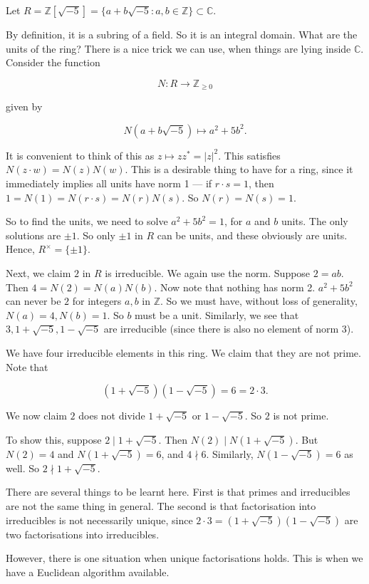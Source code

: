 \documentclass[12pt, a4paper]{article}
\begin{document}
\begin{mdexample}[Counterexample]
Let \( R = \mathbb{Z}[\sqrt{-5}] = \{a + b\sqrt{-5} : a, b \in \mathbb{Z}\} \subset \mathbb{C} \). 

By definition, it is a subring of a field. So it is an integral domain. What are the units of the ring? There is a nice trick we can use, when things are lying inside \(\mathbb{C}\). Consider the function

\[ N : R \to \mathbb{Z}_{\geq 0} \]

given by

\[ N(a + b\sqrt{-5}) \mapsto a^2 + 5b^2. \]

It is convenient to think of this as \( z \mapsto zz^* = |z|^2 \). This satisfies \( N(z \cdot w) = N(z)N(w) \). This is a desirable thing to have for a ring, since it immediately implies all units have norm 1 — if \( r \cdot s = 1 \), then \( 1 = N(1) = N(r \cdot s) = N(r)N(s) \). So \( N(r) = N(s) = 1 \).

So to find the units, we need to solve \( a^2 + 5b^2 = 1 \), for \( a \) and \( b \) units. The only solutions are \( \pm 1 \). So only \( \pm 1 \) in \( R \) can be units, and these obviously are units. Hence, \( R^\times = \{ \pm 1\} \).

Next, we claim \( 2 \) in \( R \) is irreducible. We again use the norm. Suppose \( 2 = ab \). Then \( 4 = N(2) = N(a)N(b) \). Now note that nothing has norm 2. \( a^2 + 5b^2 \) can never be \( 2 \) for integers \( a, b \) in \( \mathbb{Z} \). So we must have, without loss of generality, \( N(a) = 4, N(b) = 1 \). So \( b \) must be a unit. Similarly, we see that \( 3, 1 + \sqrt{-5}, 1 - \sqrt{-5} \) are irreducible (since there is also no element of norm 3).

We have four irreducible elements in this ring. We claim that they are not prime. Note that

\[ (1 + \sqrt{-5})(1 - \sqrt{-5}) = 6 = 2 \cdot 3. \]

We now claim \( 2 \) does not divide \( 1 + \sqrt{-5} \) or \( 1 - \sqrt{-5} \). So \( 2 \) is not prime.

To show this, suppose \( 2 \mid 1 + \sqrt{-5} \). Then \( N(2) \mid N(1 + \sqrt{-5}) \). But \( N(2) = 4 \) and \( N(1 + \sqrt{-5}) = 6 \), and \( 4 \nmid 6 \). Similarly, \( N(1 - \sqrt{-5}) = 6 \) as well. So \( 2 \nmid 1 + \sqrt{-5} \).

There are several things to be learnt here. First is that primes and irreducibles are not the same thing in general. The second is that factorisation into irreducibles is not necessarily unique, since \( 2 \cdot 3 = (1 + \sqrt{-5})(1 - \sqrt{-5}) \) are two factorisations into irreducibles.

However, there is one situation when unique factorisations holds. This is when we have a Euclidean algorithm available.

\end{mdexample}
\end{document}
